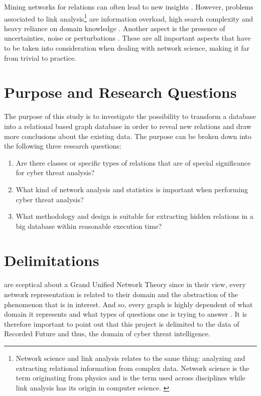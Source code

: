 Mining networks for relations can often lead to new insights \cite{hendrix2010}. However, problems associated to link analysis\footnote{Network science and link analysis relates to the same thing: analyzing and extracting relational information from complex data. Network science is the term originating from physics and is the term used across disciplines while link analysis has its origin in computer science. \cite{fouss2016algorithms}} are information overload, high search complexity and heavy reliance on domain knowledge \cite{hendrix2010,schroeder2007}. Another aspect is the presence of uncertainties, noise or perturbations \cite{hendrix2010}. These are all important aspects that have to be taken into consideration when dealing with network science, making it far from trivial to practice. 

\section{Purpose and Research Questions}
The purpose of this study is to investigate the possibility to transform a database into a relational based graph database in order to reveal new relations and draw more conclusions about the existing data. The purpose can be broken down into the following three research questions:
\begin{enumerate}
	\item Are there classes or specific types of relations that are of special significance for cyber threat analysis?
    \item What kind of network analysis and statistics is important when performing cyber threat analysis?
    \item What methodology and design is suitable for extracting hidden relations in a big database within reasonable execution time?
\end{enumerate}

\section{Delimitations}
\citet{brandes2013} are sceptical about a Grand Unified Network Theory since in their view, every network representation is related to their domain and the abstraction of the phenomenon that is in interest. And so, every graph is highly dependent of what domain it represents and what types of questions one is trying to answer \cite{hendrix2010, schroeder2007}. It is therefore important to point out that this project is delimited to the data of Recorded Future and thus, the domain of cyber threat intelligence. 

